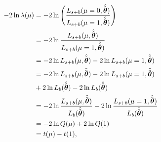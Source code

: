 \documentclass[aps,rmp,reprint,amsmath,amssymb,graphicx,longbibliography]{revtex4-1}
\begin{document}
\appendix
\begin{align}
  -2\ln \lambda(\mu) &= -2\ln\left(\frac{L_{s+b}(\mu=0,\hat{\hat{\bm{\theta}}})}{L_{s+b}(\mu=1,\hat{\hat{\bm{\theta}}})}\right) \notag \\
             &= -2\ln\frac{L_{s+b}(\mu,\hat{\hat{\bm{\theta}}})}{L_{s+b}(\mu=1,\hat{\hat{\bm{\theta}}})} \notag \notag \\
             &= -2\ln L_{s+b}(\mu,\hat{\hat{\bm{\theta}}}) - 2\ln L_{s+b}(\mu=1,\hat{\hat{\bm{\theta}}}) \notag \\              &= -2\ln L_{s+b}(\mu,\hat{\hat{\bm{\theta}}}) - 2\ln L_{s+b}(\mu=1,\hat{\hat{\bm{\theta}}}) \notag \\              &+2\ln L_b(\hat{\hat{\bm{\theta}}}) - 2\ln L_b(\hat{\hat{\bm{\theta}}}) \notag \\
             &= -2\ln \frac{L_{s+b}(\mu,\hat{\hat{\bm{\theta}}})}{L_b(\hat{\hat{\bm{\theta}}})} - 2\ln \frac{L_{s+b}(\mu=1,\hat{\hat{\bm{\theta}}})}{L_b(\hat{\hat{\bm{\theta}}})} \notag \\
             &= -2\ln Q(\mu) + 2\ln Q(1) \notag \\
             &= t(\mu) - t(1),   \label{eq:14}
\end{align}

\cite{moustakides2019training}
\end{document}
